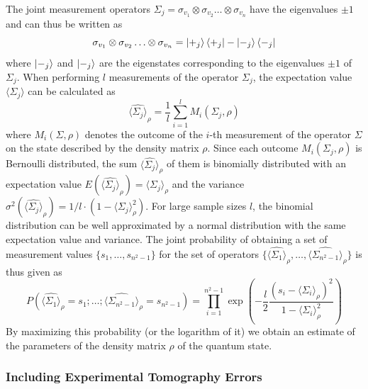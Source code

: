The joint measurement operators $\Sigma_j = \sigma_{v_1}\otimes \sigma_{v_2}\hdots \otimes\sigma_{v_n}$ have the eigenvalues $\pm 1$ and can thus be written as 
\begin{equation}
\sigma_{v_1}\otimes \sigma_{v_2}\hdots \otimes\sigma_{v_n} = \left| +_j \right>\left< +_j \right|-\left| -_j \right>\left< -_j \right| \label{eq:ml_operators}
\end{equation}
where $\left| -_j \right>$ and $\left| -_j \right>$ are the eigenstates corresponding to the eigenvalues $\pm 1$ of $\Sigma_j$. When performing $l$ measurements of the operator $\Sigma_j$, the expectation value $\langle \Sigma_j \rangle$ can be calculated as
%
\begin{equation}
\widehat{\langle \Sigma_j \rangle}_\rho = \frac{1}{l}\sum\limits_{i = 1}^l M_i(\Sigma_j,\rho) \label{eq:tomography_measurement_estimator}
\end{equation}
where $M_i(\Sigma,\rho)$ denotes the outcome of the $i$-th measurement of the operator $\Sigma$ on the state described by the density matrix $\rho$. Since each outcome $M_i(\Sigma_j,\rho)$ is Bernoulli distributed, the sum $\langle\hat{\Sigma_j}\rangle_\rho$ of them is binomially distributed with an expectation value \mbox{$E(\widehat{\langle \Sigma_j \rangle}_\rho) = \langle \Sigma_j \rangle_\rho$} and the variance $\sigma^2(\widehat{\langle \Sigma_j \rangle}_\rho) = 1/l \cdot (1-\langle \Sigma_j \rangle_\rho^2)$. For large sample sizes $l$, the binomial distribution can be well approximated by a normal distribution with the same expectation value and variance. The joint probability of obtaining a set of measurement values $\{s_1,\hdots,s_{n^2-1}\}$ for the set of operators $\{\widehat{\langle\Sigma_1 \rangle}_\rho,\hdots,\widehat{\langle\Sigma_{n^2-1} \rangle}_\rho\}$ is thus given as
%
\begin{equation}
P\left(\widehat{\langle \Sigma_1 \rangle }_\rho = s_1;\hdots;\widehat{\langle \Sigma_{n^2-1} \rangle}_\rho =  s_{n^2-1}\right) = \prod\limits_{i = 1}^{n^2-1} \exp{\left(-\frac{l}{2}\frac{(s_i-\langle \Sigma_i \rangle_\rho)^2}{1-\langle \Sigma_i \rangle_\rho^2}\right)}
\end{equation}
%
By maximizing this probability (or the logarithm of it) we obtain an estimate of the parameters of the density matrix $\rho$ of the quantum state. 

\subsubsection{Including Experimental Tomography Errors}

